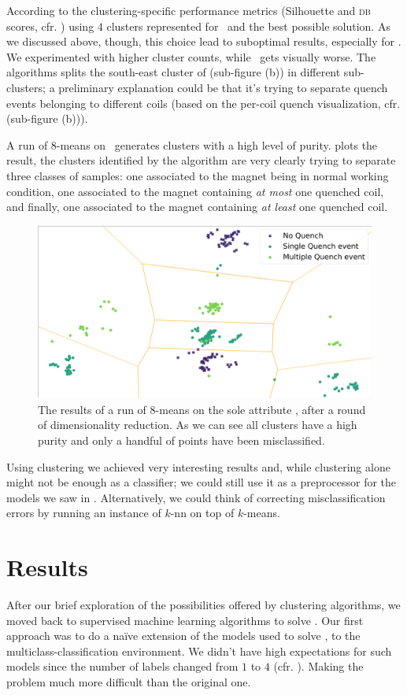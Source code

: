 According to the clustering-specific performance metrics (Silhouette and \textsc{db} scores, cfr.
) using $4$ clusters represented for \an\ and \cnmod the best possible solution.
As we discussed above, though, this choice lead to suboptimal results, especially for \an.  We
experimented with higher cluster counts, while \cnmod\ gets visually worse. The algorithms splits
the south-east cluster of  (sub-figure (b)) in different sub-clusters; a
preliminary explanation could be that it's trying to separate quench events belonging to different
coils (based on the per-coil quench visualization, cfr.  (sub-figure (b))).

A run of $8$-means on \an\ generates clusters with a high level of purity.  plots the result, the clusters identified by the algorithm are very clearly trying to separate three classes of samples: one associated to the magnet being in normal working condition, one associated to the magnet containing \emph{at most} one quenched coil, and finally, one associated to the magnet containing \emph{at least} one quenched coil.
\begin{figure}[!ht]
	\centering
	\includegraphics[width=0.8\linewidth]{img/clustering_an_qlp_8c.png}
	\caption{The results of a run of $8$-means on the sole attribute \an, after a round of \pca
		dimensionality reduction. As we can see all clusters have a high purity and only a handful of points have been misclassified.}\label{fig:clustering-an}
\end{figure}

Using clustering we achieved very interesting results and, while clustering alone might not be
enough as a classifier; we could still use it as a preprocessor for the models we saw in
. Alternatively, we could think of correcting misclassification errors by running an instance of $k$-nn on top of $k$-means.

\section{Results}
After our brief exploration of the possibilities offered by clustering algorithms, we moved back to
supervised machine learning algorithms to solve \qlp. Our first approach was to do a na\"ive
extension of the models used to solve \qrp, to the multiclass-classification environment. We didn't
have high expectations for such models since the number of labels changed from $1$ to $4$ (cfr.
). Making the problem much more difficult than the original one.

